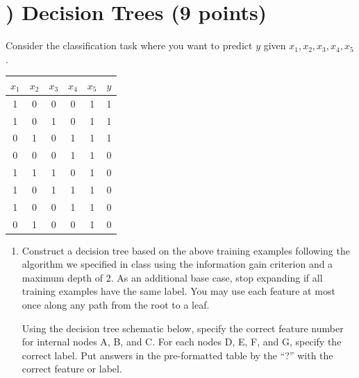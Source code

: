 \documentclass[11pt]{article}
\newcounter{QuestionCounter}
\newcounter{SubQuestionCounter}[QuestionCounter]
\newcommand{\newquestion}{\stepcounter{QuestionCounter}\setcounter{SubQuestionCounter}{1}\newpage}
\begin{document}
\newquestion
\section*{) Decision Trees (9 points)} {
Consider the classification task where you want to predict $y$ given $x_1, x_2,
x_3, x_4, x_5$.
\begin{center}
\begin{tabular}{ ccccc|c }
 $x_1$ & $x_2$ & $x_3$ & $x_4$ & $x_5$ & $y$ \\\cline{1-5}
 \hline
 1 & 0 & 0 & 0 & 1 & 1 \\
 1 & 0 & 1 & 0 & 1 & 1 \\
 0 & 1 & 0 & 1 & 1 & 1 \\
 0 & 0 & 0 & 1 & 1 & 0 \\
 1 & 1 & 1 & 0 & 1 & 0 \\
 1 & 0 & 1 & 1 & 1 & 0 \\
 1 & 0 & 0 & 1 & 1 & 0 \\
 0 & 1 & 0 & 0 & 1 & 0 \\
\end{tabular}
\end{center}

\begin{enumerate}[{(1)}]

\item Construct a decision tree based on the above training examples following
  the algorithm we specified in class using the information gain criterion and a
  maximum depth of 2.  As an additional base case, stop expanding if all
  training examples have the same label. You may use each feature at most once
  along any path from the root to a leaf.

  Using the decision tree schematic below, specify the correct feature number
  for internal nodes A, B, and C.  For each nodes D, E, F, and G, specify the
  correct label.  Put answers in the pre-formatted table by the ``?''  with the
  correct feature or label.



\end{enumerate}}
\end{document}
